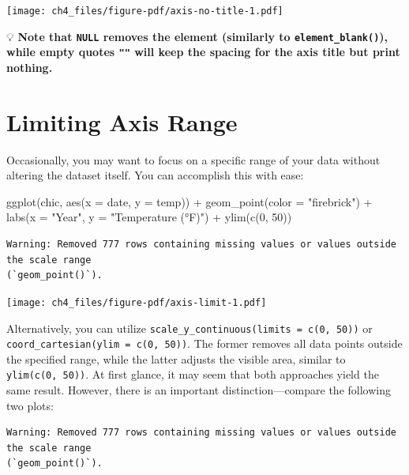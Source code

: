 \documentclass[
  letterpaper,
  DIV=11,
  numbers=noendperiod]{scrreprt}
\newenvironment{Shaded}{\begin{snugshade}}{\end{snugshade}}
\newcommand{\AttributeTok}[1]{\textcolor[rgb]{0.40,0.45,0.13}{#1}}
\newcommand{\DecValTok}[1]{\textcolor[rgb]{0.68,0.00,0.00}{#1}}
\newcommand{\FunctionTok}[1]{\textcolor[rgb]{0.28,0.35,0.67}{#1}}
\newcommand{\NormalTok}[1]{\textcolor[rgb]{0.00,0.23,0.31}{#1}}
\newcommand{\SpecialCharTok}[1]{\textcolor[rgb]{0.37,0.37,0.37}{#1}}
\newcommand{\StringTok}[1]{\textcolor[rgb]{0.13,0.47,0.30}{#1}}
\begin{document}
\texttt{[image: ch4\_files/figure-pdf/axis-no-title-1.pdf]}

💡 \textbf{Note that \texttt{NULL} removes the element (similarly to
\texttt{element\_blank()}), while empty quotes \texttt{""} will keep the
spacing for the axis title but print nothing.}

\section{Limiting Axis Range}\label{limiting-axis-range}

Occasionally, you may want to focus on a specific range of your data
without altering the dataset itself. You can accomplish this with ease:

\begin{Shaded}
\begin{Highlighting}[]
\FunctionTok{ggplot}\NormalTok{(chic, }\FunctionTok{aes}\NormalTok{(}\AttributeTok{x =}\NormalTok{ date, }\AttributeTok{y =}\NormalTok{ temp)) }\SpecialCharTok{+}
  \FunctionTok{geom\_point}\NormalTok{(}\AttributeTok{color =} \StringTok{"firebrick"}\NormalTok{) }\SpecialCharTok{+}
  \FunctionTok{labs}\NormalTok{(}\AttributeTok{x =} \StringTok{"Year"}\NormalTok{, }\AttributeTok{y =} \StringTok{"Temperature (°F)"}\NormalTok{) }\SpecialCharTok{+}
  \FunctionTok{ylim}\NormalTok{(}\FunctionTok{c}\NormalTok{(}\DecValTok{0}\NormalTok{, }\DecValTok{50}\NormalTok{))}
\end{Highlighting}
\end{Shaded}

\begin{verbatim}
Warning: Removed 777 rows containing missing values or values outside the scale range
(`geom_point()`).
\end{verbatim}

\texttt{[image: ch4\_files/figure-pdf/axis-limit-1.pdf]}

Alternatively, you can utilize
\texttt{scale\_y\_continuous(limits\ =\ c(0,\ 50))} or
\texttt{coord\_cartesian(ylim\ =\ c(0,\ 50))}. The former removes all
data points outside the specified range, while the latter adjusts the
visible area, similar to \texttt{ylim(c(0,\ 50))}. At first glance, it
may seem that both approaches yield the same result. However, there is
an important distinction---compare the following two plots:

\begin{verbatim}
Warning: Removed 777 rows containing missing values or values outside the scale range
(`geom_point()`).
\end{verbatim}
\end{document}
